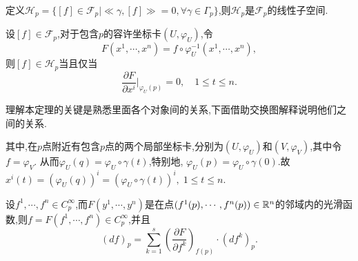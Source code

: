 定义$\mathscr{H}_p=\{[f]\in\mathscr{F}_p| \ll \gamma,[f]\gg=0,\forall \gamma\in \Gamma_p\}$,则$\mathscr{H}_p$是$\mathscr{F}_p$的线性子空间.

\begin{theorem}[][thm:1.11]
设$[f]\in\mathscr{F}_p$,对于包含$p$的容许坐标卡$(U,\varphi_U)$,令
\begin{equation*}
F(x^1,\cdots,x^n)=f\circ\varphi_U^{-1}(x^1,\cdots,x^n),
\end{equation*}
则$[f]\in\mathscr{H}_p$当且仅当
\begin{equation*}
\frac{\partial F}{\partial x^i}\Bigg|_{\varphi_U(p)}=0,\quad 1\leqslant t\leqslant n.
\end{equation*}
\end{theorem}

\begin{remark}
理解本定理的关键是熟悉里面各个对象间的关系,下面借助交换图解释说明他们之间的关系.
\begin{center}
\end{center}
其中,在$p$点附近有包含$p$点的两个局部坐标卡,分别为$(U,\varphi_U)$和$(V,\varphi_V)$,其中令$f=\varphi_V$.
从而$\varphi_U(q)=\varphi_U\circ \gamma(t)$,特别地, $\varphi_U(p)=\varphi_U\circ \gamma(0)$.故$x^i (t)=\left(\varphi_U(q)\right)^i=\left(\varphi_U\circ \gamma(t)\right)^i,\; 1\leqslant t\leqslant n$.
\end{remark}

\begin{theorem}[][thm:1.22]
设$f^1,\cdots,f^n\in C_p^\infty$,而$F(y^1,\cdots,y^n)$是在点$(f^1(p),\cdots,f^n(p))\in \mathbb{R}^n$的邻域内的光滑函数,则$f=F(f^1,\cdots,f^n)\in C_p^\infty$,并且
\begin{equation*}
(df)_p=\sum_{k=1}^{s}\left(\frac{\partial F}{\partial f^k}\right)_{f(p)}\cdot (df^k)_p.
\end{equation*}
\end{theorem}

